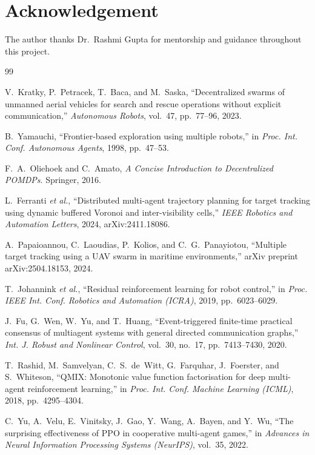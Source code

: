 \documentclass[conference]{IEEEtran}
\begin{document}
\section*{Acknowledgement}
The author thanks Dr.~Rashmi Gupta for mentorship and guidance throughout this project.

\begin{thebibliography}{99}

V.~Kratky, P.~Petracek, T.~Baca, and M.~Saska,
``Decentralized swarms of unmanned aerial vehicles for search and rescue operations without explicit communication,''
\emph{Autonomous Robots}, vol.~47, pp.~77--96, 2023.

B.~Yamauchi,
``Frontier-based exploration using multiple robots,''
in \emph{Proc. Int. Conf. Autonomous Agents}, 1998, pp.~47--53.

F.~A.~Oliehoek and C.~Amato,
\emph{A Concise Introduction to Decentralized POMDPs}.
Springer, 2016.

L.~Ferranti \emph{et al.},
``Distributed multi-agent trajectory planning for target tracking using dynamic buffered Voronoi and inter-visibility cells,''
\emph{IEEE Robotics and Automation Letters}, 2024, arXiv:2411.18086.

A.~Papaioannou, C.~Laoudias, P.~Kolios, and C.~G.~Panayiotou,
``Multiple target tracking using a UAV swarm in maritime environments,''
arXiv preprint arXiv:2504.18153, 2024.

T.~Johannink \emph{et al.},
``Residual reinforcement learning for robot control,''
in \emph{Proc. IEEE Int. Conf. Robotics and Automation (ICRA)}, 2019, pp.~6023--6029.

J.~Fu, G.~Wen, W.~Yu, and T.~Huang,
``Event-triggered finite-time practical consensus of multiagent systems with general directed communication graphs,''
\emph{Int. J. Robust and Nonlinear Control}, vol.~30, no.~17, pp.~7413--7430, 2020.

T.~Rashid, M.~Samvelyan, C.~S.~de~Witt, G.~Farquhar, J.~Foerster, and S.~Whiteson,
``QMIX: Monotonic value function factorisation for deep multi-agent reinforcement learning,''
in \emph{Proc. Int. Conf. Machine Learning (ICML)}, 2018, pp.~4295--4304.

C.~Yu, A.~Velu, E.~Vinitsky, J.~Gao, Y.~Wang, A.~Bayen, and Y.~Wu,
``The surprising effectiveness of PPO in cooperative multi-agent games,''
in \emph{Advances in Neural Information Processing Systems (NeurIPS)}, vol.~35, 2022.


\end{thebibliography}
\end{document}

